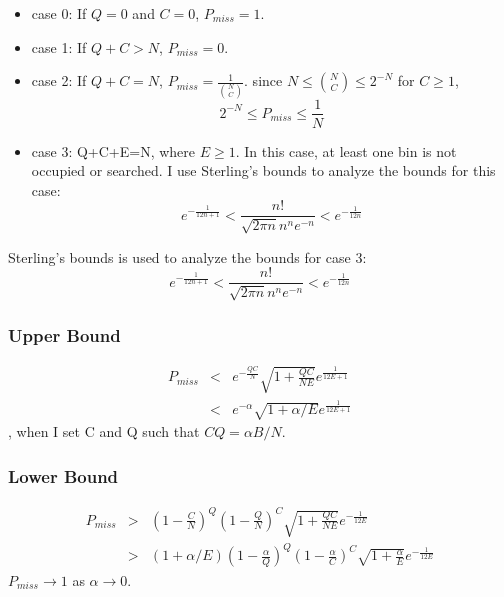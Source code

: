 \documentclass[red]{beamer}
\begin{document}
\begin{frame}
\begin{itemize}
\item case 0: If $Q=0$ and $C=0$, $P_{miss}=1$.
\item case 1: If $Q+C>N$, $P_{miss}=0$.
\item case 2: If $Q+C=N$, $P_{miss}=\frac{1}{{{N}\choose{C}}}$. 
since $N \leq {{N}\choose{C}} \leq 2^{-N}$ for $C\geq 1$,  
\begin{equation}
2^{-N} \leq P_{miss} \leq \frac{1}{N}
\end{equation}
\item case 3: Q+C+E=N, where $E\geq1$. In this case, at least one bin is not 
occupied or searched.
I use Sterling's bounds to analyze the bounds for this case:
\begin{equation}
e^{-\frac{1}{12n+1}} < \frac{n!}{\sqrt{2\pi n}n^n e^{-n}} < e^{-\frac{1}{12n}}
\end{equation}
\end{itemize}
\end{frame}

\begin{frame}
Sterling's bounds is used to analyze the bounds for case 3:
\begin{equation}
e^{-\frac{1}{12n+1}} < \frac{n!}{\sqrt{2\pi n}n^n e^{-n}} < e^{-\frac{1}{12n}}
\end{equation}
\end{frame}

\begin{frame}
\frametitle{Upper Bound}
\begin{eqnarray}
P_{miss} &<&e^{-\frac{QC}{N}} \sqrt{1+\frac{QC}{NE}} e^{\frac{1}{12E+1}}\\
         &<& e^{-\alpha}\sqrt{1+\alpha/E}e^{\frac{1}{12E+1}}
\end{eqnarray}
, when I set C and Q such that $CQ = \alpha B/N$.
\end{frame}

\begin{frame}
\frametitle{Lower Bound}
\begin{eqnarray}
P_{miss} &>& \left(1-\frac{C}{N}\right)^Q\left(1-\frac{Q}{N}\right)^C \sqrt{1+\frac{QC}{NE}} e^{-\frac{1}{12E}}\\
         &>& (1+\alpha/E)\left(1-\frac{\alpha}{Q}\right)^Q \left(1-\frac{\alpha}{C}\right)^C \sqrt{1+\frac{\alpha}{E}} e^{-\frac{1}{12E}}
\end{eqnarray}
$P_{miss} \rightarrow 1$ as $\alpha \rightarrow 0$.
\end{frame}
\end{document}
